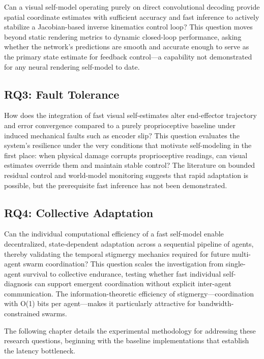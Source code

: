 \documentclass[12pt,a4paper,oneside]{report}
\begin{document}
Can a visual self-model operating purely on direct convolutional decoding provide spatial coordinate estimates with sufficient accuracy and fast inference to actively stabilize a Jacobian-based inverse kinematics control loop? This question moves beyond static rendering metrics to dynamic closed-loop performance, asking whether the network's predictions are smooth and accurate enough to serve as the primary state estimate for feedback control—a capability not demonstrated for any neural rendering self-model to date.

\subsection{RQ3: Fault Tolerance}
\label{subsec:rq3_fault_tolerance}

How does the integration of fast visual self-estimates alter end-effector trajectory and error convergence compared to a purely proprioceptive baseline under induced mechanical faults such as encoder slip? This question evaluates the system's resilience under the very conditions that motivate self-modeling in the first place: when physical damage corrupts proprioceptive readings, can visual estimates override them and maintain stable control? The literature on bounded residual control and world-model monitoring suggests that rapid adaptation is possible, but the prerequisite fast inference has not been demonstrated.

\subsection{RQ4: Collective Adaptation}
\label{subsec:rq4_collective_adaptation}

Can the individual computational efficiency of a fast self-model enable decentralized, state-dependent adaptation across a sequential pipeline of agents, thereby validating the temporal stigmergy mechanics required for future multi-agent swarm coordination? This question scales the investigation from single-agent survival to collective endurance, testing whether fast individual self-diagnosis can support emergent coordination without explicit inter-agent communication. The information-theoretic efficiency of stigmergy—coordination with O(1) bits per agent—makes it particularly attractive for bandwidth-constrained swarms.

The following chapter details the experimental methodology for addressing these research questions, beginning with the baseline implementations that establish the latency bottleneck.
\end{document}
